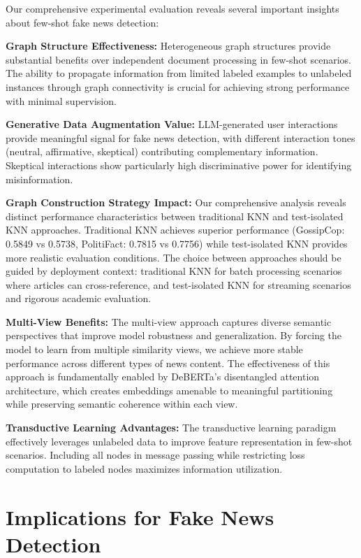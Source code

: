 Our comprehensive experimental evaluation reveals several important insights about few-shot fake news detection:

\textbf{Graph Structure Effectiveness:} Heterogeneous graph structures provide substantial benefits over independent document processing in few-shot scenarios. The ability to propagate information from limited labeled examples to unlabeled instances through graph connectivity is crucial for achieving strong performance with minimal supervision.

\textbf{Generative Data Augmentation Value:} LLM-generated user interactions provide meaningful signal for fake news detection, with different interaction tones (neutral, affirmative, skeptical) contributing complementary information. Skeptical interactions show particularly high discriminative power for identifying misinformation.

\textbf{Graph Construction Strategy Impact:} Our comprehensive analysis reveals distinct performance characteristics between traditional KNN and test-isolated KNN approaches. Traditional KNN achieves superior performance (GossipCop: 0.5849 vs 0.5738, PolitiFact: 0.7815 vs 0.7756) while test-isolated KNN provides more realistic evaluation conditions. The choice between approaches should be guided by deployment context: traditional KNN for batch processing scenarios where articles can cross-reference, and test-isolated KNN for streaming scenarios and rigorous academic evaluation.

\textbf{Multi-View Benefits:} The multi-view approach captures diverse semantic perspectives that improve model robustness and generalization. By forcing the model to learn from multiple similarity views, we achieve more stable performance across different types of news content. The effectiveness of this approach is fundamentally enabled by DeBERTa's disentangled attention architecture, which creates embeddings amenable to meaningful partitioning while preserving semantic coherence within each view.

\textbf{Transductive Learning Advantages:} The transductive learning paradigm effectively leverages unlabeled data to improve feature representation in few-shot scenarios. Including all nodes in message passing while restricting loss computation to labeled nodes maximizes information utilization.

\section{Implications for Fake News Detection}

